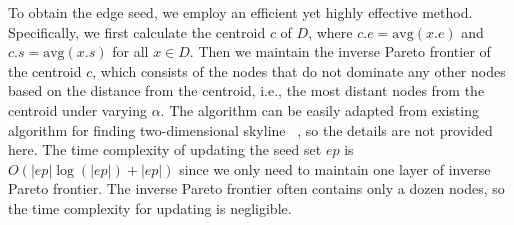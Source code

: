 

To obtain the edge seed, we employ an efficient yet highly effective method. Specifically, we first calculate the centroid $c$ of $D$, where $c.e = \text{avg}(x.e)$ and $c.s = \text{avg}(x.s)$ for all $x \in D$. Then we maintain the inverse Pareto frontier of the centroid $c$, which consists of the nodes that do not dominate any other nodes based on the distance from the centroid, i.e., the most distant nodes from the centroid under varying $\alpha$. The algorithm can be easily adapted from existing algorithm for finding two-dimensional skyline~\cite{borzsony2001skyline}%
, so the details are not provided here. The time complexity of updating the seed set $ep$ is $O(|ep|\log(|ep|) + |ep|)$ since we only need to maintain one layer of inverse Pareto frontier. The inverse Pareto frontier often contains only a dozen nodes, so the time complexity for updating is negligible.

